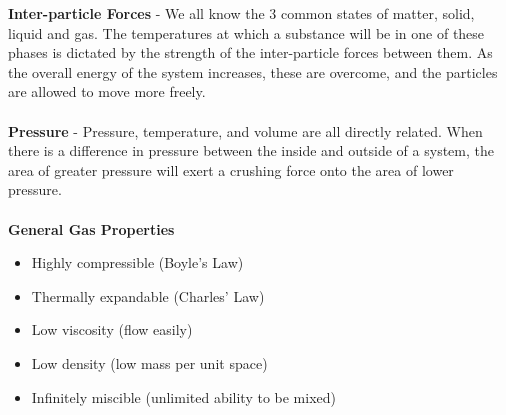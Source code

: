 \documentclass{article}
\begin{document}
	\vspace{10pt}
	\noindent \textbf{Inter-particle Forces} - We all know the 3 common states of matter, solid, liquid and gas. The temperatures at which a substance will be in one of these phases is dictated by the strength of the inter-particle forces between them. As the overall energy of the system increases, these are overcome, and the particles are allowed to move more freely. \\
	\\
	\textbf{Pressure} - Pressure, temperature, and volume are all directly related. When there is a difference in pressure between the inside and outside of a system, the area of greater pressure will exert a crushing force onto the area of lower pressure. \\
	\\
	\textbf{General Gas Properties}
	
	
	
	{                                     %
		\setlength{\leftmargini}{1.5cm}         %
		\begin{itemize}
			\item Highly compressible (Boyle's Law)
			\item Thermally expandable (Charles' Law)
			\item Low viscosity (flow easily)
			\item Low density (low mass per unit space)
			\item Infinitely miscible (unlimited ability to be mixed)
		\end{itemize}
	}      
	
\end{document}

